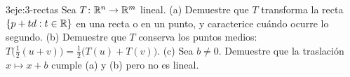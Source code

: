 \begin{ejercicio}{3}{eje:3-rectas}
Sea $T\colon\mathbb{R}^{n}\to\mathbb{R}^{m}$ lineal. (a) Demuestre que $T$ transforma la recta $\{p+td: t\in\mathbb{R}\}$ en una recta o en un punto, y caracterice cuándo ocurre lo segundo. (b) Demuestre que $T$ conserva los puntos medios: $T\bigl(\tfrac12(u+v)\bigr)=\tfrac12\bigl(T(u)+T(v)\bigr)$. (c) Sea $b\neq 0$. Demuestre que la traslación $x\mapsto x+b$ cumple (a) y (b) pero no es lineal.
\end{ejercicio}
